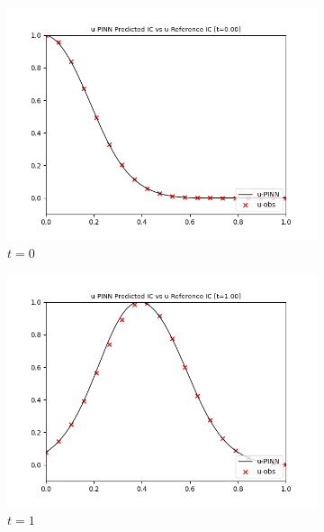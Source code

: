 \documentclass[letterpaper,11pt]{article}
\begin{document}
    \begin{figure}[h]
        \centering
        \begin{subfigure}{0.45\textwidth}
            \includegraphics*[width=\textwidth]{advection_forward_t0.00.png}
            \caption{$t = 0$}
        \end{subfigure}
        \hfill
        \begin{subfigure}{0.45\textwidth}
            \includegraphics*[width=\textwidth]{advection_forward_t1.00.png}
            \caption{$t = 1$}
        \end{subfigure}
        \begin{subfigure}{0.45\textwidth}

\end{subfigure}
\end{figure}
\end{document}
